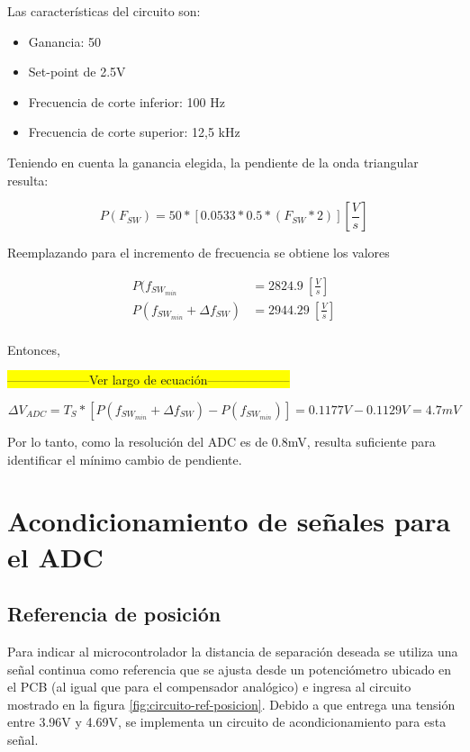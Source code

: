 \noindent Las características del circuito son:

\begin{itemize}
	\item Ganancia: 50
	\item Set-point de 2.5V 
	\item Frecuencia de corte inferior: 100 Hz
	\item Frecuencia de corte superior: 12,5 kHz
\end{itemize}

\noindent Teniendo en cuenta la ganancia elegida,  la pendiente de la onda triangular resulta:

\begin{equation} 
	P(F_{SW}) = 50 * [0.0533 * 0.5 * (F_{SW}*2)][\frac{V}{s}]
\end{equation}

\noindent Reemplazando para el incremento de frecuencia se obtiene los valores 

\begin{equation} 
	\begin{aligned}
		P(f_{SW_{min}} &= 2824.9 \ [\frac{V}{s}]\\
		P(f_{SW_{min}} + \Delta f_{SW}) &= 2944.29 \ [\frac{V}{s}]\\		 
	\end{aligned}
\end{equation}

\noindent Entonces, 

\colorbox{yellow}{--------------------Ver largo de ecuación--------------------}

\begin{equation} 
	\Delta V_{ADC} = T_S * [P(f_{SW_{min}} + \Delta f_{SW}) - P(f_{SW_{min}})] = 0.1177 V - 0.1129 V = 4.7mV
\end{equation}


\noindent Por lo tanto, como la resolución del ADC es de 0.8mV, resulta suficiente para identificar el mínimo cambio de pendiente.


\section{Acondicionamiento de señales para el ADC}

\subsection{Referencia de posición}

\noindent Para indicar al microcontrolador la distancia de separación deseada se utiliza una señal continua como referencia que se ajusta desde un potenciómetro ubicado en el PCB (al igual que para el compensador analógico) e ingresa al circuito mostrado en la figura \ref{fig:circuito-ref-posicion}. Debido a que entrega una tensión entre 3.96V y 4.69V, se implementa un circuito de acondicionamiento para esta señal.

